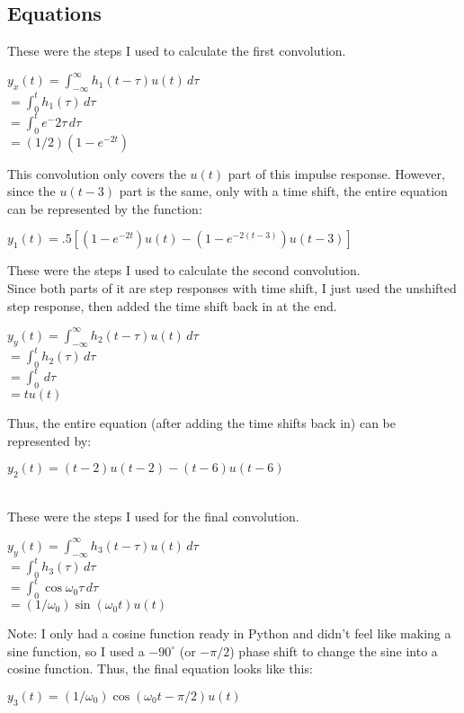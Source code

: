 \documentclass[12pt,a4paper]{article}
\begin{document}
\subsection{Equations}
These were the steps I used to calculate the first convolution.\\
\begin{center}
$y_x (t) = \int_{-\infty}^{\infty} h_1 (t - \tau) u(t) \,d\tau \ $\\
$=  \int_{0}^{t} h_1 (\tau) \,d\tau \ $\\
$= \int_{0}^{t} e^-2\tau \,d\tau \ $\\
$= (1/2)(1-e^{-2t})$\\
\end{center}
This convolution only covers the $u(t)$ part of this impulse response. However, since the $u(t-3)$ part is the same, only with a time shift, the entire equation can be represented by the function:\\
\begin{center}
$y_1 (t) = .5[(1 - e^{-2t} )u(t) - (1 - e^{-2(t-3)})u(t-3)]$
\end{center}
These were the steps I used to calculate the second convolution.\\
Since both parts of it are step responses with time shift, I just used the unshifted step response, then added the time shift back in at the end.\\
\begin{center}
$y_y (t) = \int_{-\infty}^{\infty} h_2 (t - \tau) u(t) \,d\tau \ $ \\
$=  \int_{0}^{t} h_2 (\tau) \,d\tau \ $\\
$= \int_{0}^{t} \,d\tau \ $\\
$= tu(t)$
\end{center}
Thus, the entire equation (after adding the time shifts back in) can be represented by:\\
\begin{center}
$y_2 (t) = (t - 2)u(t-2) - (t-6)u(t-6)$
\end{center}
\\
These were the steps I used for the final convolution.
\begin{center}
 $y_y (t) = \int_{-\infty}^{\infty} h_3 (t - \tau) u(t) \,d\tau \ $ \\
 $=  \int_{0}^{t} h_3 (\tau) \,d\tau \ $\\
 $= \int_{0}^{t} \cos{\omega_0 \tau} \,d\tau \ $\\
 $= (1/\omega_0)\sin{(\omega_0 t)}u(t)$
\end{center}
Note: I only had a cosine function ready in Python and didn't feel like making a sine function, so I used a $-90^{\circ}$ (or $-\pi/2$) phase shift to change the sine into a cosine function. Thus, the final equation looks like this:\\
\begin{center}
 $y_3 (t)= (1/\omega_0)\cos{(\omega_0 t - \pi/2)}u(t)$
\end{center}
\end{document}
